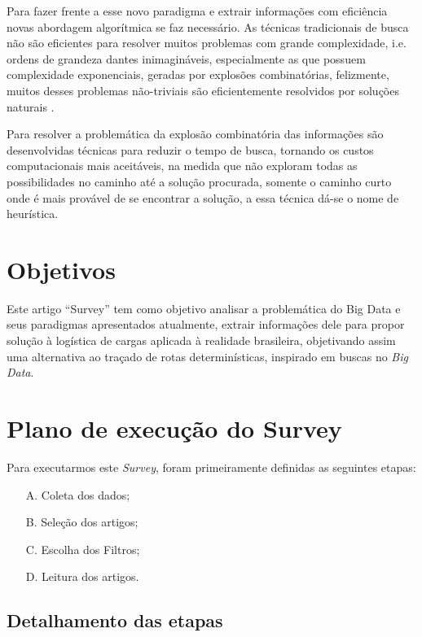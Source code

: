 \documentclass[conference,compsoc]{IEEEtran}
\begin{document}
Para fazer frente a esse novo paradigma e extrair informações com eficiência novas abordagem algorítmica se faz necessário. 
As técnicas tradicionais de busca não são eficientes para resolver muitos problemas com grande complexidade, i.e. ordens de grandeza 
dantes inimagináveis, especialmente as que possuem complexidade exponenciais, geradas por explosões combinatórias, felizmente, 
muitos desses problemas não-triviais são eficientemente resolvidos por soluções naturais \cite{Swarm_Medeiros}.

Para resolver a problemática da explosão combinatória das informações são desenvolvidas técnicas para reduzir o tempo de busca, 
tornando os custos computacionais mais aceitáveis, na medida que não exploram todas as possibilidades no caminho até a 
solução procurada, somente o caminho curto onde é mais provável de se encontrar a solução, a essa técnica dá-se o nome de heurística.



\section{Objetivos}

Este artigo ``Survey'' tem como objetivo analisar a problemática do Big Data e seus paradigmas apresentados atualmente, extrair informações dele para propor solução à logística de cargas aplicada à realidade brasileira, objetivando assim uma alternativa ao traçado de rotas determinísticas, inspirado em buscas no \textit{Big Data}.



\section{Plano de execução do Survey}

Para executarmos este \textit{Survey}, foram primeiramente definidas as seguintes etapas:

\begin{enumerate}
 \item[A.] Coleta dos dados;
 \item[B.] Seleção dos artigos; 
 \item[C.] Escolha dos Filtros;
 \item[D.] Leitura dos artigos.
\end{enumerate}

\subsection{Detalhamento das etapas}
\end{document}
